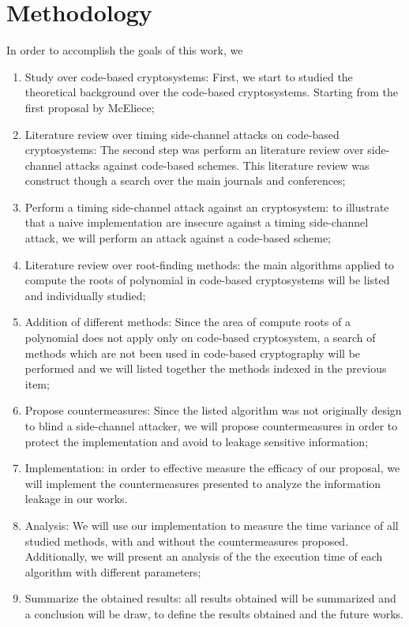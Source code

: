 \section{Methodology}
In order to accomplish the goals of this work, we 
\begin{enumerate}
    \item Study over code-based cryptosystems: First, we start to studied the theoretical background over the code-based cryptosystems. Starting from the first proposal by McEliece;
    \item Literature review over timing side-channel attacks on code-based cryptosystems: The second step was perform an literature review over side-channel attacks against code-based schemes. This literature review was construct though a search over the main journals and conferences;
    \item Perform a timing side-channel attack against an cryptosystem: to illustrate that a naive implementation are insecure against a timing side-channel attack, we will perform an attack against a code-based scheme;
    \item Literature review over root-finding methods: the main algorithms applied to compute the roots of polynomial in code-based cryptosystems will be listed and individually studied; 
    \item Addition of different methods: Since the area of compute roots of a polynomial does not apply only on code-based cryptosystem, a search of methods which are not been used in code-based cryptography will be performed and we will listed together the methods indexed in the previous item;
    \item Propose countermeasures: Since the listed algorithm was not originally design to blind a side-channel attacker, we will propose countermeasures in order to protect the implementation and avoid to leakage sensitive information;
    \item Implementation: in order to effective measure the efficacy of our proposal, we will implement the countermeasures presented to analyze the information leakage in our works.
    \item Analysis: We will use our implementation to measure the time variance of all studied methods, with and without the countermeasures proposed. Additionally, we will present an analysis of the the execution time of each algorithm with different parameters;
    \item Summarize the obtained results: all results obtained will be summarized and a conclusion will be draw, to define the results obtained and the future works.
\end{enumerate}

